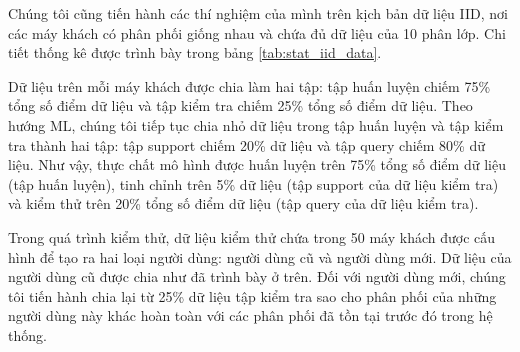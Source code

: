 Chúng tôi cũng tiến hành các thí nghiệm của mình trên kịch bản dữ liệu IID, nơi các máy khách có phân phối giống nhau và chứa đủ dữ liệu của 10 phân lớp. Chi tiết thống kê được trình bày trong bảng \ref{tab:stat_iid_data}.

\begin{table}[H]
    \caption{Thống kê trên hai tập dữ liệu MNIST và CIFAR-10 (dữ liệu IID)}
    \label{tab:stat_iid_data}
\end{table}

Dữ liệu trên mỗi máy khách được chia làm hai tập: tập huấn luyện chiếm 75\% tổng số điểm dữ liệu và tập kiểm tra chiếm 25\% tổng số điểm dữ liệu. Theo hướng ML, chúng tôi tiếp tục chia nhỏ dữ liệu trong tập huấn luyện và tập kiểm tra thành hai tập: tập support chiếm 20\% dữ liệu và tập query chiếm 80\% dữ liệu. Như vậy, thực chất mô hình được huấn luyện trên 75\% tổng số điểm dữ liệu (tập huấn luyện), tinh chỉnh trên 5\% dữ liệu (tập support của dữ liệu kiểm tra) và kiểm thử trên 20\% tổng số điểm dữ liệu (tập query của dữ liệu kiểm tra).

Trong quá trình kiểm thử, dữ liệu kiểm thử chứa trong 50 máy khách được cấu hình để tạo ra hai loại người dùng: người dùng cũ và người dùng mới. Dữ liệu của người dùng cũ được chia như đã trình bày ở trên. Đối với người dùng mới, chúng tôi tiến hành chia lại từ 25\% dữ liệu tập kiểm tra sao cho phân phối của những người dùng này khác hoàn toàn với các phân phối đã tồn tại trước đó trong hệ thống.

